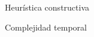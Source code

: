 \begin{section}{Heurística constructiva}
		\begin{subsection}{Complejidad temporal}
		\end{subsection}

\end{section}

